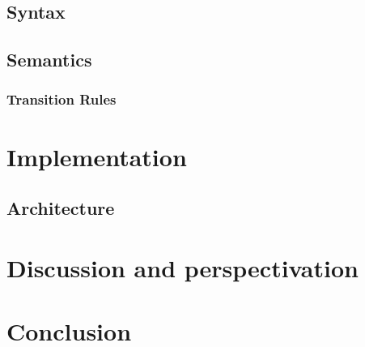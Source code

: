 \section{Syntax}
\section{Semantics}
\subsection{Transition Rules}

\renewcommand{\ind}[1]{}
\chapter{Implementation}
\label{chap:implementation}
\ind{ImplementaitionIntro}
\ind{EvaluationCriteria}
\section{Architecture}
\ind{Architecture}	
\ind{Hardware}
\ind{OverviewCompiler}
\ind{compilerchoice}
\ind{languageprocessing}
\ind{CompilationPasses}
\ind{AbstractSyntaxTrees}
\ind{ParseTree}
\ind{VisitorPattern}
\ind{SyntacticAnalysis}
\ind{KnownLexersAndParsers}
\ind{ANTLR}
\ind{LexicalAnalyzer}
\ind{Tokens}
\ind{Parser}
\ind{ContextualAnalysis}
\ind{Scoping}
\ind{Typechecking}
\ind{TheoryCodeGeneration}
\ind{CodeGeneration}
\ind{UnitTests}
\ind{ComponentSetup}
\ind{TestComponent}

\renewcommand{\ind}[1]{}
\chapter{Discussion and perspectivation}
\label{chap:disper}
\ind{FormaliaPerspektivering}

\chapter{Conclusion}
\ind{FormaliaKonklusion}


